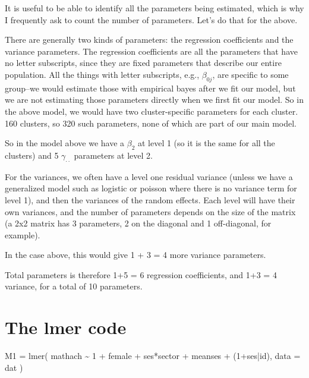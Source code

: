 \documentclass[
  letterpaper,
  DIV=11,
  numbers=noendperiod]{scrreprt}
\newenvironment{Shaded}{}{}
\newcommand{\AttributeTok}[1]{\textcolor[rgb]{0.49,0.56,0.16}{#1}}
\newcommand{\DecValTok}[1]{\textcolor[rgb]{0.25,0.63,0.44}{#1}}
\newcommand{\FunctionTok}[1]{\textcolor[rgb]{0.02,0.16,0.49}{#1}}
\newcommand{\NormalTok}[1]{#1}
\newcommand{\OtherTok}[1]{\textcolor[rgb]{0.00,0.44,0.13}{#1}}
\newcommand{\SpecialCharTok}[1]{\textcolor[rgb]{0.25,0.44,0.63}{#1}}
\begin{document}
It is useful to be able to identify all the parameters being estimated,
which is why I frequently ask to count the number of parameters. Let's
do that for the above.

There are generally two kinds of parameters: the regression coefficients
and the variance parameters. The regression coefficients are all the
parameters that have no letter subscripts, since they are fixed
parameters that describe our entire population. All the things with
letter subscripts, e.g., \(\beta_{0j}\), are specific to some group--we
would estimate those with empirical bayes after we fit our model, but we
are not estimating those parameters directly when we first fit our
model. So in the above model, we would have two cluster-specific
parameters for each cluster. 160 clusters, so 320 such parameters, none
of which are part of our main model.

So in the model above we have a \(\beta_2\) at level 1 (so it is the
same for all the clusters) and 5 \(\gamma_{\cdot\cdot}\) parameters at
level 2.

For the variances, we often have a level one residual variance (unless
we have a generalized model such as logistic or poisson where there is
no variance term for level 1), and then the variances of the random
effects. Each level will have their own variances, and the number of
parameters depends on the size of the matrix (a 2x2 matrix has 3
parameters, 2 on the diagonal and 1 off-diagonal, for example).

In the case above, this would give 1 + 3 = 4 more variance parameters.

Total parameters is therefore 1+5 = 6 regression coefficients, and 1+3 =
4 variance, for a total of 10 parameters.

\section{The lmer code}\label{the-lmer-code}

\begin{Shaded}
\begin{Highlighting}[]
\NormalTok{M1 }\OtherTok{=} \FunctionTok{lmer}\NormalTok{( mathach }\SpecialCharTok{\textasciitilde{}} \DecValTok{1} \SpecialCharTok{+}\NormalTok{ female }\SpecialCharTok{+}\NormalTok{ ses}\SpecialCharTok{*}\NormalTok{sector }\SpecialCharTok{+} 
\NormalTok{             meanses }\SpecialCharTok{+}\NormalTok{ (}\DecValTok{1}\SpecialCharTok{+}\NormalTok{ses}\SpecialCharTok{|}\NormalTok{id),}
           \AttributeTok{data =}\NormalTok{ dat )}
\end{Highlighting}
\end{Shaded}
\end{document}
